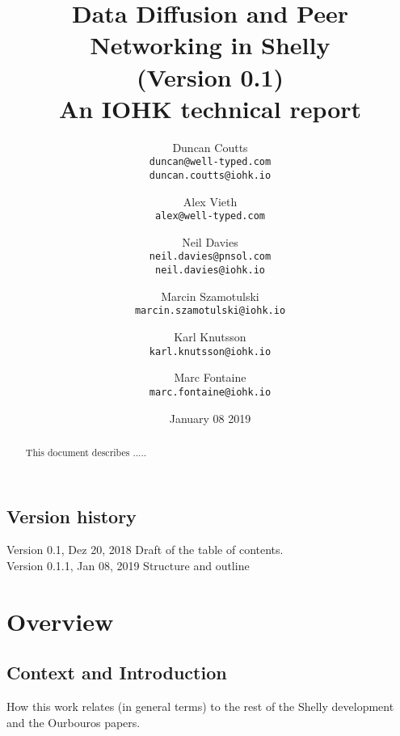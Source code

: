 \documentclass{report}
\theoremstyle{definition}{
  \newtheorem{lemma}{Lemma}[section] %
  \newtheorem{definition}[lemma]{Definition}
}
\theoremstyle{theorem}{
  \newtheorem{invariant}[lemma]{Invariant}
  \newtheorem{proofobligation}[lemma]{Proof Obligation}
}
\numberwithin{equation}{lemma}
\begin{document}
\title{Data Diffusion and Peer Networking in Shelly\\
       {\small (Version 0.1)} \\
       {\large \sc An IOHK technical report}}
\author{Duncan Coutts \\ {\small \texttt{duncan@well-typed.com}} \\
                         {\small \texttt{duncan.coutts@iohk.io}}
   \and Alex Vieth \\ {\small \texttt{alex@well-typed.com}}
   \and Neil Davies \\ {\small \texttt{neil.davies@pnsol.com}} \\
                       {\small \texttt{neil.davies@iohk.io}}
   \and Marcin Szamotulski \\ {\small \texttt{marcin.szamotulski@iohk.io}}
   \and Karl Knutsson \\ {\small \texttt{karl.knutsson@iohk.io}}
   \and Marc Fontaine \\ {\small \texttt{marc.fontaine@iohk.io}}
   }
\date{January 08 2019}

\maketitle

\begin{abstract}
  This document describes .....
\end{abstract}

\tableofcontents

\section*{Version history}

\begin{description}
\item[Version 0.1, Dez 20, 2018  Draft of the table of contents.]
\item[Version 0.1.1, Jan 08, 2019 Structure and outline]
\end{description}

\chapter{Overview}
\section{Context and Introduction}

How this work relates (in general terms) to the rest of the Shelly
development and the Ourbouros papers.
\end{document}
